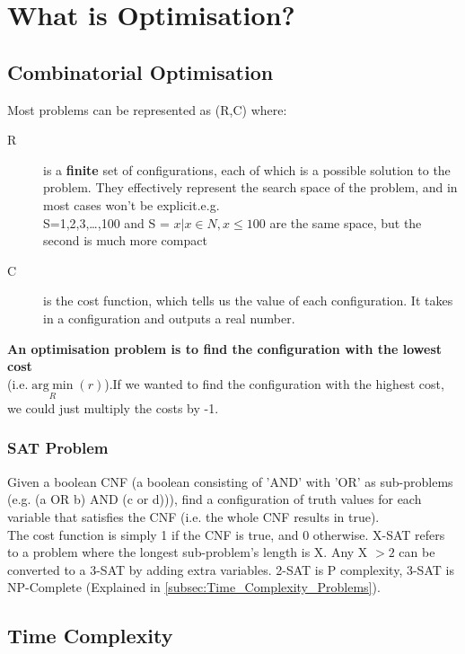 \section{What is Optimisation?}

\subsection{Combinatorial Optimisation}\label{sec:Combinatorial_Optimisation}
Most problems can be represented as (R,C) where:
\begin{description}
    \item[R] is a \textbf{finite} set of configurations, each of which is a possible solution to the problem. They effectively represent the search space of the problem, and in most cases won't be explicit.e.g.\\
    S={1,2,3,\dots ,100} and S = ${x|x\in N, x\leq 100}$ are the same space, but the second is much more compact
    \item[C] is the cost function, which tells us the value of each configuration. It takes in a configuration and outputs a real number. 
\end{description}
\textbf{An optimisation problem is to find the configuration with the lowest cost}\\(i.e.$\underset{R}{\operatorname{arg\; min}}(r)$).If we wanted to find the configuration with the highest cost, we could just multiply the costs by -1.

\subsubsection{SAT Problem}
Given a boolean CNF (a boolean consisting of 'AND' with 'OR' as sub-problems\\(e.g. (a OR b) AND (c or d))), find a configuration of truth values for each variable that satisfies the CNF (i.e. the whole CNF results in true). \\
The cost function is simply 1 if the CNF is true, and 0 otherwise. X-SAT refers to a problem where the longest sub-problem's length is X. Any X $>2$ can be converted to a 3-SAT by adding extra variables.  2-SAT is P complexity, 3-SAT is NP-Complete (Explained in \ref{subsec:Time_Complexity_Problems}).



\subsection{Time Complexity}

